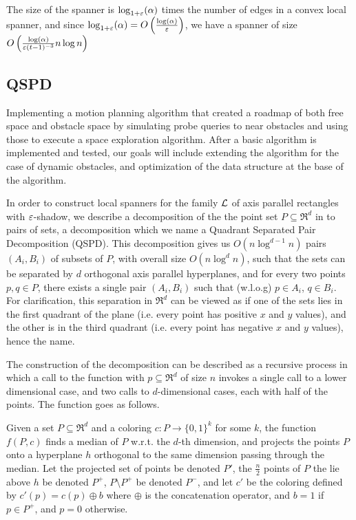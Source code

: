 \documentclass[12pt]{article}%
\begin{document}
The size of the spanner is $\log_{1+\varepsilon}(\alpha)$ times the number of edges in a convex local spanner, and since $\log_{1+\varepsilon}(\alpha)=O\left(\frac{\log(\alpha)}{\varepsilon}\right)$, we have a spanner of size $O\left(\frac{\log(\alpha)}{\varepsilon (t-1)^{-3}}n\log n\right)$

\subsection{QSPD}
Implementing a motion planning algorithm that created a roadmap of both free space and obstacle space by simulating probe queries to near obstacles and using those to execute a space exploration algorithm.
After a basic algorithm is implemented and tested, our goals will include extending the algorithm for the case of dynamic obstacles, and optimization of the data structure at the base of the algorithm.

In order to construct local spanners for the family $\mathcal{L}$ of axis parallel rectangles with $\varepsilon$-shadow, we describe a decomposition of the the point set $P\subseteq \Re^d$ in to pairs of sets, a decomposition which we name a Quadrant Separated Pair Decomposition (QSPD). This decomposition gives us $O(n\log^{d-1}n)$ pairs $(A_i,B_i)$ of subsets of $P$, with overall size $O(n\log^{d}n)$, such that the sets can be separated by $d$ orthogonal axis parallel hyperplanes, and for every two points $p,q\in P$, there exists a single pair $(A_i,B_i)$ such that (w.l.o.g) $p\in A_i$, $q\in B_i$. For clarification, this separation in $\Re^d$ can be viewed as if one of the sets lies in the first quadrant of the plane (i.e. every point has positive $x$ and $y$ values), and the other is in the third quadrant (i.e. every point has negative $x$ and $y$ values), hence the name.

The construction of the decomposition can be described as a recursive process in which a call to the function with $p\subseteq \Re^d$ of size $n$ invokes a single call to a lower dimensional case, and two calls to $d$-dimensional cases, each with half of the points. The function goes as follows.

Given a set $P\subseteq \Re^d$ and a coloring $c:P\longrightarrow \{0,1\}^k$ for some $k$, the function $f(P,c)$ finds a median of $P$ w.r.t. the $d$-th dimension, and projects the points $P$ onto a hyperplane $h$ orthogonal to the same dimension passing through the median. Let the projected set of points be denoted $P'$, the $\frac{n}{2}$ points of $P$ the lie above $h$ be denoted $P^+$, $P\setminus P^+$ be denoted $P^-$, and let $c'$ be the coloring defined by  $c'(p)=c(p)\oplus b$ where $\oplus$ is the concatenation operator, and $b=1$ if $p\in P^+$, and $p=0$ otherwise.
\end{document}
